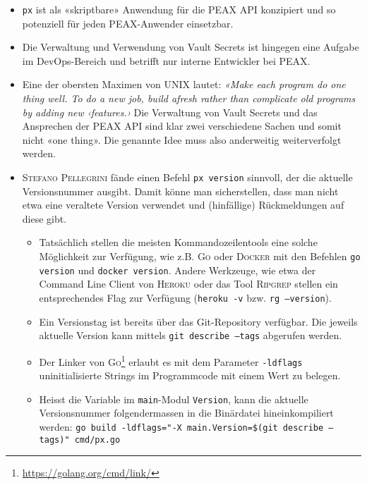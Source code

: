 \begin{itemize}
\begin{itemize}
        \item \texttt{px} ist als «skriptbare» Anwendung für die PEAX API konzipiert und so potenziell für jeden PEAX-Anwender einsetzbar.
        \item Die Verwaltung und Verwendung von Vault Secrets ist hingegen eine Aufgabe im DevOps-Bereich und betrifft nur interne Entwickler bei PEAX.
        \item Eine der obersten Maximen von UNIX lautet: \textit{«Make each program do one thing well. To do a new job, build afresh rather than complicate old programs by adding new ‹features.›} \cite[p. 3]{unixtimesharing} Die Verwaltung von Vault Secrets und das Ansprechen der PEAX API sind klar zwei verschiedene Sachen und somit nicht «one thing». Die genannte Idee muss also anderweitig weiterverfolgt werden.
    \end{itemize}
\end{itemize}

\begin{itemize}
    \item \textsc{Stefano Pellegrini} fände einen Befehl \texttt{px version} sinnvoll, der die aktuelle Versionsnummer ausgibt. Damit könne man sicherstellen, dass man nicht etwa eine veraltete Version verwendet und (hinfällige) Rückmeldungen auf diese gibt.
        \begin{itemize}
            \item Tatsächlich stellen die meisten Kommandozeilentools eine solche Möglichkeit zur Verfügung, wie z.B. \textsc{Go} oder \textsc{Docker} mit den Befehlen \texttt{go version} und \texttt{docker version}. Andere Werkzeuge, wie etwa der Command Line Client von \textsc{Heroku} oder das Tool \textsc{Ripgrep} stellen ein entsprechendes Flag zur Verfügung (\texttt{heroku -v} bzw. \texttt{rg --version}).
            \item Ein Versionstag ist bereits über das Git-Repository verfügbar. Die jeweils aktuelle Version kann mittels \texttt{git describe --tags} abgerufen werden.
            \item Der Linker von \textsc{Go}\footnote{\url{https://golang.org/cmd/link/}} erlaubt es mit dem Parameter \texttt{-ldflags} uninitialisierte Strings im Programmcode mit einem Wert zu belegen.
            \item Heisst die Variable im \texttt{main}-Modul \texttt{Version}, kann die aktuelle Versionsnummer folgendermassen in die Binärdatei hineinkompiliert werden: \texttt{go build -ldflags="{}-X main.Version=\$(git describe --tags)"{} cmd/px.go}
        \end{itemize} 
\end{itemize}
